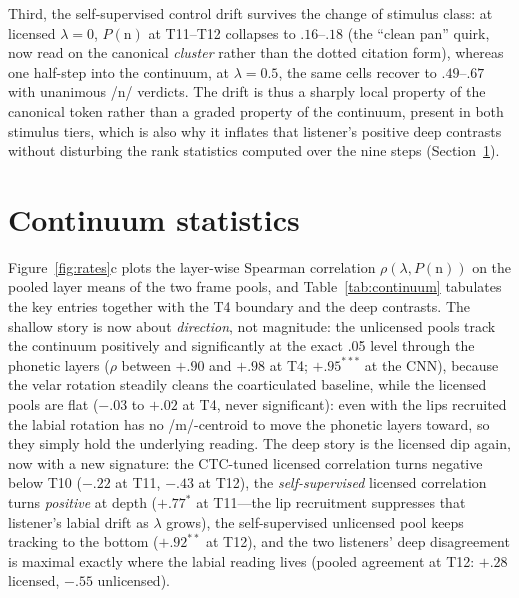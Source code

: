 \documentclass[11pt,a4paper]{article}
\newcommand{\lam}{\lambda}
\begin{document}
Third, the self-supervised control drift survives the change of
stimulus class: at licensed $\lam=0$, $P(\mathrm{n})$ at T11--T12
collapses to $.16$--$.18$ (the ``clean pan'' quirk, now read on the
canonical \emph{cluster} rather than the dotted citation form),
whereas one half-step into the continuum, at $\lam=0.5$, the same
cells recover to $.49$--$.67$ with unanimous /n/ verdicts. The drift
is thus a sharply local property of the canonical token rather than
a graded property of the continuum, present in both stimulus tiers,
which is also why it inflates that listener's positive deep
contrasts without disturbing the rank statistics computed over the
nine steps (Section~\ref{sec:continuum}).

\section{Continuum statistics}
\label{sec:continuum}

Figure~\ref{fig:rates}c plots the layer-wise Spearman correlation
$\rho(\lam, P(\mathrm{n}))$ on the pooled layer means of the two
frame pools, and Table~\ref{tab:continuum} tabulates the key entries
together with the T4 boundary and the deep contrasts. The shallow
story is now about \emph{direction}, not magnitude: the unlicensed
pools track the continuum positively and significantly at the exact
.05 level through the phonetic layers ($\rho$ between $+.90$ and
$+.98$ at T4; $+.95^{***}$ at the CNN), because the velar rotation
steadily cleans the coarticulated baseline, while the licensed pools
are flat ($-.03$ to $+.02$ at T4, never significant): even with the
lips recruited the labial rotation has no /m/-centroid to move the
phonetic layers toward, so they simply hold the underlying reading.
The deep story is the licensed dip again, now with a new signature:
the CTC-tuned licensed correlation turns negative below T10 ($-.22$
at T11, $-.43$ at T12), the \emph{self-supervised} licensed
correlation turns \emph{positive} at depth ($+.77^{*}$ at T11---the
lip recruitment suppresses that listener's labial drift as $\lam$
grows), the self-supervised unlicensed pool keeps tracking to the
bottom ($+.92^{**}$ at T12), and the two listeners' deep disagreement
is maximal exactly where the labial reading lives (pooled agreement
at T12: $+.28$ licensed, $-.55$ unlicensed).
\end{document}
